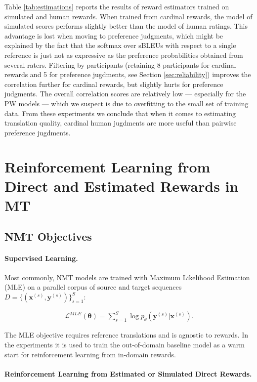 Table \ref{tab:estimations} reports the results of reward estimators trained on simulated and human rewards. When trained from cardinal rewards, the model of simulated scores performs slightly better than the model of human ratings. This advantage is lost when moving to preference judgments, which might be explained by the fact that the softmax over sBLEUs with respect to a single reference is just not as expressive as the preference probabilities obtained from several raters. Filtering by participants (retaining 8 participants for cardinal rewards and 5 for preference jugdments, see Section \ref{sec:reliability}) improves the correlation further for cardinal rewards, but slightly hurts for preference judgments. The overall correlation scores are relatively low --- especially for the PW models --- which we suspect is due to overfitting to the small set of training data. From these experiments we conclude that when it comes to estimating translation quality, cardinal human jugdments are more useful than pairwise preference jugdments. 

\section{Reinforcement Learning from Direct and Estimated Rewards in MT}
\label{sec:rl}

\subsection{NMT Objectives}

\paragraph{Supervised Learning.} Most commonly, NMT models are trained with Maximum Likelihood Estimation (MLE) on a parallel corpus of source and target sequences $D = \{(\mathbf{x}^{(s)}, \mathbf{y}^{(s)})\}^{S}_{s=1}$:

\begin{align*}
\mathcal{L}^{MLE}(\boldsymbol \theta) = \sum_{s=1}^S \log p_{\theta}(\mathbf{y}^{(s)}|\mathbf{x}^{(s)}). 
\end{align*}

 
The MLE objective requires reference translations and is agnostic to rewards. In the experiments it is used to train the out-of-domain baseline model as a warm start for reinforcement learning from in-domain rewards.

\paragraph{Reinforcement Learning from Estimated or Simulated Direct Rewards.} 

